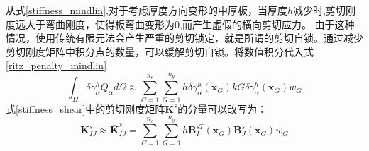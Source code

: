 从式\eqref{stiffness_mindlin},对于考虑厚度方向变形的中厚板，当厚度$h$减少时,剪切刚度远大于弯曲刚度，使得板弯曲变形为$0$,而产生虚假的横向剪切应力。
由于这种情况，使用传统有限元法会产生严重的剪切锁定，就是所谓的剪切自锁。通过减少剪切刚度矩阵中积分点的数量，可以缓解剪切自锁。将数值积分代入式\eqref{ritz_penalty_mindlin}
\begin{equation}
    \int_{\Omega}\delta\gamma^h_{\alpha}Q_{\alpha}d\Omega \approx
    \sum_{C=1}^{n_e}\sum_{G=1}^{n_g} h \delta\gamma^h_{\alpha}(\boldsymbol x_G) kG \delta\gamma^h_{\alpha}(\boldsymbol x_G) w_G
\end{equation}
式\eqref{stiffness_shear}中的剪切刚度矩阵$\boldsymbol K^s$的分量可以改写为：
\begin{equation}
    \boldsymbol K^s_{IJ} \approx \bar{\boldsymbol K}^s_{IJ} = \sum_{C=1}^{n_e}\sum_{G=1}^{n_g} h\boldsymbol B^{sT}_I(\boldsymbol x_G) \boldsymbol B_J^s(\boldsymbol x_G) w_G
\end{equation}

